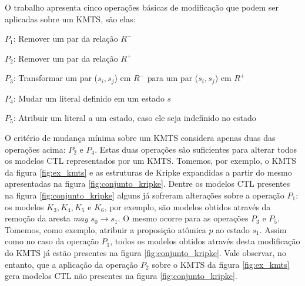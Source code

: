 \documentclass[normaltoc,capchap,capsec,times]{abnt}
\begin{document}

O trabalho \cite{aline} apresenta cinco operações básicas de modificação que podem ser aplicadas sobre um KMTS, são elas:
%
\begin{description}[noitemsep]
	\item $P_1$: Remover um par da relação $R^-$
	\item $P_2$: Remover um par da relação $R^+$
	\item $P_3$: Transformar um par ($s_i,s_j$) em $R^-$ para um par ($s_i,s_j$) em $R^+$
	\item $P_4$: Mudar um literal definido em um estado $s$
	\item $P_5$: Atribuir um literal a um estado, caso ele seja indefinido no estado
\end{description}


O critério de mudança mínima sobre um KMTS  considera apenas duas das operações acima: $P_2$ e $P_4$. Estas duas operações são suficientes para alterar todos os modelos CTL representados por um KMTS. Tomemos, por exemplo, o KMTS da figura \ref{fig:ex_kmts} e as estruturas de Kripke expandidas a partir do mesmo apresentadas na figura \ref{fig:conjunto_kripke}. Dentre os modelos CTL presentes na figura \ref{fig:conjunto_kripke} alguns já sofreram alterações sobre a operação $P_1$: os modelos $K_3,K_4,K_5$ e $K_6$, por exemplo, são modelos obtidos através da remoção da aresta \textit{may} $s_0 \to s_1$. O mesmo ocorre para as operações $P_3$ e $P_5$. Tomemos, como exemplo, atribuir a proposição atômica $p$ ao estado $s_1$. Assim como no caso da operação $P_1$, todos os modelos obtidos através desta modificação do KMTS já estão presentes na figura \ref{fig:conjunto_kripke}. Vale observar, no entanto, que a aplicação da operação $P_2$ sobre o KMTS da figura \ref{fig:ex_kmts} gera modelos CTL não presentes na figura \ref{fig:conjunto_kripke}. 
\end{document}

